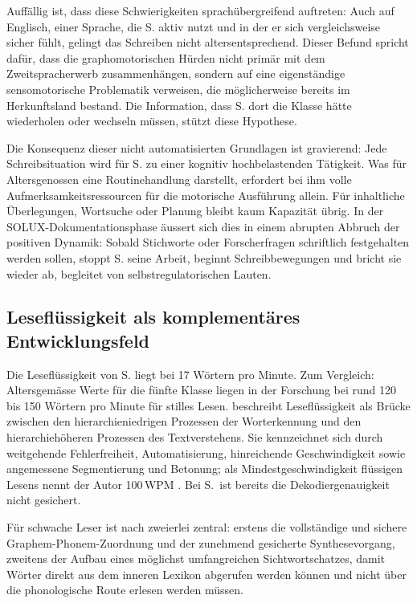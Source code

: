 \documentclass[ngerman, a4paper]{article}
\begin{document}
Auffällig ist, dass diese Schwierigkeiten sprachübergreifend auftreten: Auch auf Englisch,
einer Sprache, die S. aktiv nutzt und in der er sich vergleichsweise sicher fühlt,
gelingt das Schreiben nicht altersentsprechend. Dieser Befund spricht dafür, dass die
graphomotorischen Hürden nicht primär mit dem Zweitspracherwerb zusammenhängen,
sondern auf eine eigenständige sensomotorische Problematik verweisen, die möglicherweise
bereits im Herkunftsland bestand. Die Information, dass S. dort die Klasse hätte
wiederholen oder wechseln müssen, stützt diese Hypothese.

Die Konsequenz dieser nicht automatisierten Grundlagen ist gravierend: Jede
Schreibsituation wird für S. zu einer kognitiv hochbelastenden Tätigkeit. Was für
Altersgenossen eine Routinehandlung darstellt, erfordert bei ihm volle
Aufmerksamkeitsressourcen für die motorische Ausführung allein. Für inhaltliche
Überlegungen, Wortsuche oder Planung bleibt kaum Kapazität übrig. In der
SOLUX-Dokumentationsphase äussert sich dies in einem abrupten Abbruch der positiven
Dynamik: Sobald Stichworte oder Forscherfragen schriftlich festgehalten werden sollen,
stoppt S. seine Arbeit, beginnt Schreibbewegungen und bricht sie wieder ab, begleitet
von selbstregulatorischen Lauten.

\subsection{Leseflüssigkeit als komplementäres Entwicklungsfeld}

Die Leseflüssigkeit von S. liegt bei 17 Wörtern pro Minute. Zum Vergleich: Altersgemässe
Werte für die fünfte Klasse liegen in der Forschung bei rund 120 bis 150 Wörtern pro
Minute für stilles Lesen.
\textcite[S.\,67\,f.]{gold2018lesenkannmanlernen} beschreibt Leseflüssigkeit als
Brücke zwischen den hierarchieniedrigen Prozessen der Worterkennung und den
hierarchiehöheren Prozessen des Textverstehens. Sie kennzeichnet sich durch
weitgehende Fehlerfreiheit, Automatisierung, hinreichende Geschwindigkeit
sowie angemessene Segmentierung und Betonung; als Mindestgeschwindigkeit
flüssigen Lesens nennt der Autor 100\,WPM
\parencite[S.\,68]{gold2018lesenkannmanlernen}.
Bei S.\ ist bereits die Dekodiergenauigkeit nicht gesichert.

Für schwache Leser ist nach \textcite[S.\,62]{gold2018lesenkannmanlernen}
zweierlei zentral: erstens die vollständige und sichere Graphem-Phonem-Zuordnung
und der zunehmend gesicherte Synthesevorgang, zweitens der Aufbau eines
möglichst umfangreichen Sichtwortschatzes, damit Wörter direkt aus dem inneren
Lexikon abgerufen werden können und nicht über die phonologische Route erlesen
werden müssen.
\end{document}

